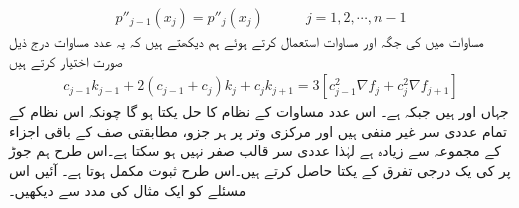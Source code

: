 \begin{align*}
p''_{j-1}(x_j)=p''_j(x_j)\quad \quad \quad j=1,2,\cdots,n-1
\end{align*}
مساوات  میں  کی جگہ   اور مساوات   استعمال کرتے ہوئے ہم دیکھتے ہیں کہ یہ  عدد مساوات درج ذیل صورت اختیار کرتے ہیں
\begin{align}\label{مساوات_اعدادی_دو_درجی_تفرق_پ}
c_{j-1}k_{j-1}+2(c_{j-1}+c_j)k_j+c_jk_{j+1}=3[c^2_{j-1}\nabla f_j+c_j^2\nabla f_{j+1}]
\end{align} 
جہاں  اور  ہیں جبکہ  ہے۔ اس  عدد مساوات کے نظام کا حل  یکتا ہو گا چونکہ اس نظام کے تمام عددی سر غیر منفی ہیں اور مرکزی وتر پر ہر جزو، مطابقتی صف کے باقی  اجزاء کے مجموعہ سے زیادہ  ہے  لہٰذا عددی سر قالب صفر نہیں ہو سکتا ہے۔اس طرح ہم جوڑ پر  کی یک درجی تفرق کے یکتا  حاصل کرتے ہیں۔اس طرح ثبوت مکمل ہوتا ہے۔
آئیں اس مسئلے کو ایک مثال کی مدد سے دیکھیں۔

